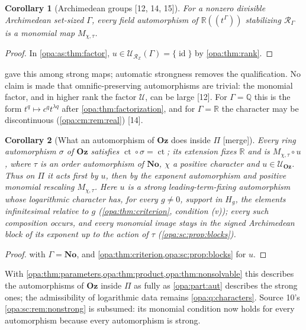 \documentclass[11pt,oneside]{article}
\numberwithin{equation}{section}
\newtheorem{corollary}[corollary]{Corollary}
\theoremstyle{definition}
\theoremstyle{remark}
\newcommand{\No}{\mathbf{No}}
\newcommand{\Oz}{\mathbf{Oz}}
\newcommand{\R}{\mathbb R}
\newcommand{\Q}{\mathbb Q}
\newcommand{\Z}{\mathbb Z}
\newcommand{\UU}{\mathcal U}
\newcommand{\ct}{\operatorname{ct}}
\newcommand{\id}{\operatorname{id}}
\newcommand{\Hahn}[2]{#1((t^{#2}))}
\newcommand{\src}[1]{\textup{\textsf{\small[#1]}}}
\newcommand{\mergetag}{\textup{\textsf{\small[merge]}}}
\begin{document}
\begin{corollary}[Archimedean groups \src{12, 14, 15}]\label{opa:as:cor:arch}
For a nonzero divisible Archimedean set-sized $\Gamma$, every field automorphism of
$\Hahn\R\Gamma$ stabilizing $\mathcal R_\Gamma$ is a monomial map $M_{\chi,\tau}$.
\end{corollary}
\begin{proof}
In \cref{opa:as:thm:factor}, $u\in\UU_{\mathcal R_\Z}(\Gamma)=\{\id\}$ by \cref{opa:thm:rank}.
\end{proof}

 gave this among strong maps; automatic strongness removes the
qualification. No claim is made that omnific-preserving automorphisms are trivial: the
monomial factor, and in higher rank the factor $\UU$, can be large \src{12}. For $\Gamma=\Q$
this is the form $t^q\mapsto c^qt^{\lambda q}$ after \cref{opa:thm:factorization}, and for
$\Gamma=\R$ the character may be discontinuous (\cref{opa:cm:rem:real}) \src{14}.

\begin{corollary}[What an automorphism of $\Oz$ does inside $\Pi$ \mergetag]\label{opa:as:cor:invisible}
Every ring automorphism $\sigma$ of $\Oz$ satisfies $\ct\circ\sigma=\ct$; its extension fixes $\R$ and is $M_{\chi,\tau}\circ
u$, where $\tau$ is an order automorphism of $\No$, $\chi$ a positive character and $u\in\UU_\Oz$.
Thus on $\Pi$ it acts first by $u$, then by the exponent automorphism and positive monomial rescaling $M_{\chi,\tau}$.
Here $u$ is a strong leading-term-fixing automorphism whose logarithmic character has, for
every $g\ne0$, support in $H_g$, the elements infinitesimal relative to $g$
(\cref{opa:thm:criterion}, condition (v)); every such composition occurs, and every monomial
image stays in the signed Archimedean block of its exponent up to the action of $\tau$
(\cref{opa:sc:prop:blocks}).
\end{corollary}
\begin{proof}
 with $\Gamma=\No$, and \cref{opa:thm:criterion,opa:sc:prop:blocks}
for $u$.
\end{proof}

With \cref{opa:thm:parameters,opa:thm:product,opa:thm:nonsolvable} this describes the
automorphisms of $\Oz$ inside $\Pi$ as fully as \cref{opa:part:aut} describes the strong
ones; the admissibility of logarithmic data remains \cref{opa:q:characters}. Source 10's
\cref{opa:sc:rem:nonstrong} is subsumed: its monomial condition now holds for every
automorphism because every automorphism is strong.
\end{document}
